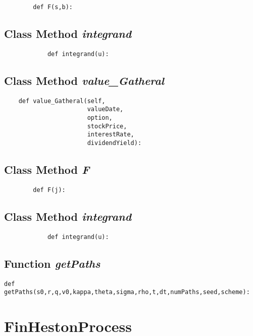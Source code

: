 \documentclass[twoside,11pt]{book}
\begin{document}
\begin{lstlisting}
        def F(s,b):
\end{lstlisting}

\subsection{Class Method {\it integrand}}


\begin{lstlisting}
            def integrand(u):
\end{lstlisting}

\subsection{Class Method {\it value\_Gatheral}}


\begin{lstlisting}
    def value_Gatheral(self,
                       valueDate,
                       option,
                       stockPrice,
                       interestRate,
                       dividendYield):
\end{lstlisting}

\subsection{Class Method {\it F}}


\begin{lstlisting}
        def F(j):
\end{lstlisting}

\subsection{Class Method {\it integrand}}


\begin{lstlisting}
            def integrand(u):
\end{lstlisting}

\subsection{Function {\it getPaths}}


\begin{lstlisting}
def getPaths(s0,r,q,v0,kappa,theta,sigma,rho,t,dt,numPaths,seed,scheme):
\end{lstlisting}

\newpage
\section{FinHestonProcess}
\end{document}
